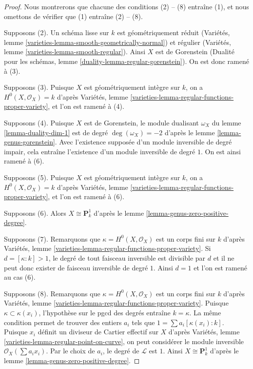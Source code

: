 \begin{proof}
Nous montrerons que chacune des conditions (2) -- (8) entraîne (1), et nous omettons de vérifier que (1) entraîne (2) -- (8).

\medskip\noindent
Supposons (2). Un schéma lisse sur $k$ est géométriquement réduit (Variétés, lemme \ref{varieties-lemma-smooth-geometrically-normal}) et régulier (Variétés, lemme \ref{varieties-lemma-smooth-regular}). Ainsi $X$ est de Gorenstein (Dualité pour les schémas, lemme \ref{duality-lemma-regular-gorenstein}). On est donc ramené à (3).

\medskip\noindent
Supposons (3). Puisque $X$ est géométriquement intègre sur $k$, on a $H^0(X, \mathcal{O}_X) = k$ d'après Variétés, lemme \ref{varieties-lemma-regular-functions-proper-variety}, et l'on est ramené à (4).

\medskip\noindent
Supposons (4). Puisque $X$ est de Gorenstein, le module dualisant $\omega_X$ du lemme \ref{lemma-duality-dim-1} est de degré $\deg(\omega_X) = -2$ d'après le lemme \ref{lemma-genus-gorenstein}. Avec l'existence supposée d'un module inversible de degré impair, cela entraîne l'existence d'un module inversible de degré $1$. On est ainsi ramené à (6).

\medskip\noindent
Supposons (5). Puisque $X$ est géométriquement intègre sur $k$, on a $H^0(X, \mathcal{O}_X) = k$ d'après Variétés, lemme \ref{varieties-lemma-regular-functions-proper-variety}, et l'on est ramené à (6).

\medskip\noindent
Supposons (6). Alors $X \cong \mathbf{P}^1_k$ d'après le lemme \ref{lemma-genus-zero-positive-degree}.

\medskip\noindent
Supposons (7). Remarquons que $\kappa = H^0(X, \mathcal{O}_X)$ est un corps fini sur $k$ d'après Variétés, lemme \ref{varieties-lemma-regular-functions-proper-variety}. Si $d = [\kappa : k] > 1$, le degré de tout faisceau inversible est divisible par $d$ et il ne peut donc exister de faisceau inversible de degré $1$. Ainsi $d = 1$ et l'on est ramené au cas (6).

\medskip\noindent
Supposons (8). Remarquons que $\kappa = H^0(X, \mathcal{O}_X)$ est un corps fini sur $k$ d'après Variétés, lemme \ref{varieties-lemma-regular-functions-proper-variety}. Puisque $\kappa \subset \kappa(x_i)$, l'hypothèse sur le pgcd des degrés entraîne $k = \kappa$. La même condition permet de trouver des entiers $a_i$ tels que $1 = \sum a_i[\kappa(x_i) : k]$. Puisque $x_i$ définit un diviseur de Cartier effectif sur $X$ d'après Variétés, lemme \ref{varieties-lemma-regular-point-on-curve}, on peut considérer le module inversible $\mathcal{O}_X(\sum a_i x_i)$. Par le choix de $a_i$, le degré de $\mathcal{L}$ est $1$. Ainsi $X \cong \mathbf{P}^1_k$ d'après le lemme \ref{lemma-genus-zero-positive-degree}.
\end{proof}

